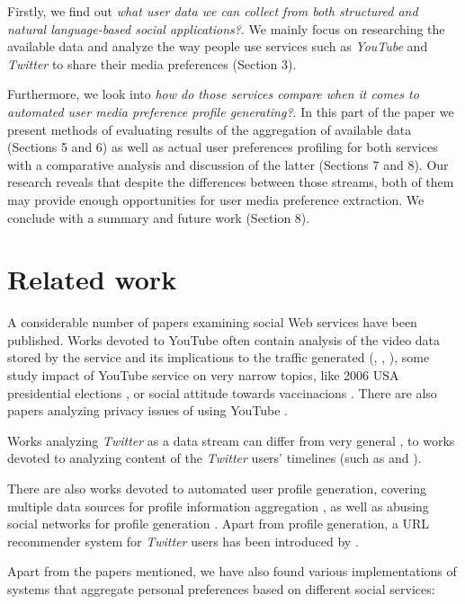 \documentclass{article}
\begin{document}
Firstly, we find out \textit{what user data we can collect from both structured and natural language-based social applications?}. We mainly focus on researching the available data and analyze the way people use services such as
\textit{YouTube} and \textit{Twitter} to share their media preferences (Section 3).

Furthermore, we look into \textit{how do those services compare when it comes to automated user media
preference profile generating?}. In this part of the paper we present methods of evaluating results of
the aggregation of available data (Sections 5 and 6) as well as actual user preferences profiling for both
services with a comparative analysis and discussion of the latter (Sections 7 and 8). Our research reveals that despite the
differences between those streams, both of them may provide enough opportunities for user media preference
extraction. We conclude with a summary and future work (Section 8).

\section{Related work}

A considerable number of papers examining social Web services have been
published. Works devoted to YouTube often contain analysis of the video data
stored by the service and its implications to the traffic generated
(\cite{i-tube-you-tube}, \cite{views-from-the-edge},
\cite{statistics-and-social-network}), some study impact of YouTube service on
very narrow topics, like 2006 USA presidential elections
\cite{voters-myspace-youtube}, or social attitude towards vaccinacions
\cite{keelan}. There are also papers analyzing privacy issues of using YouTube
\cite{publicly-private}.

Works analyzing \textit{Twitter} as a data stream can differ from very general \cite{why-we-twitter},
to works devoted to analyzing content of the \textit{Twitter} users' timelines (such as \cite{twitter-content-is-it} and \cite{short-tweet}).

There are also works devoted to automated user profile generation, covering multiple data sources for profile
information aggregation \cite{public-profiles}, as well as abusing social networks for profile generation \cite{twitter-abuse}. Apart from profile generation, a URL recommender system for \textit{Twitter} users
has been introduced by \cite{short-tweet}.

Apart from the papers mentioned, we have also found various implementations of systems that aggregate personal preferences based on different
social services:
\end{document}

